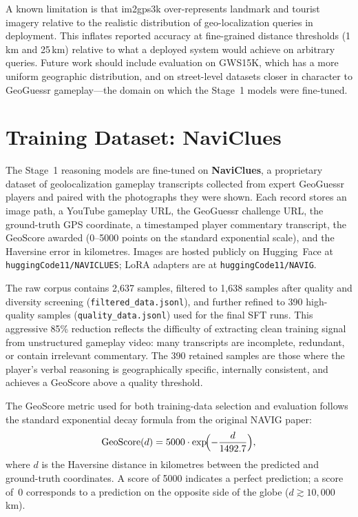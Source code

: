 \documentclass[11pt]{article}
\begin{document}
A known limitation is that im2gps3k over-represents landmark and tourist imagery
relative to the realistic distribution of geo-localization queries in deployment.
This inflates reported accuracy at fine-grained distance thresholds (1\,km and
25\,km) relative to what a deployed system would achieve on arbitrary queries.
Future work should include evaluation on GWS15K, which has a more uniform
geographic distribution, and on street-level datasets closer in character to
GeoGuessr gameplay---the domain on which the Stage~1 models were fine-tuned.

\section{Training Dataset: NaviClues}
\label{sec:navclues}

The Stage~1 reasoning models are fine-tuned on \textbf{NaviClues}, a proprietary
dataset of geolocalization gameplay transcripts collected from expert GeoGuessr
players and paired with the photographs they were shown. Each record stores an image
path, a YouTube gameplay URL, the GeoGuessr challenge URL, the ground-truth GPS
coordinate, a timestamped player commentary transcript, the GeoScore awarded
(0--5000 points on the standard exponential scale), and the Haversine error in
kilometres. Images are hosted publicly on Hugging~Face at
\texttt{huggingCode11/NAVICLUES}; LoRA adapters are at \texttt{huggingCode11/NAVIG}.

The raw corpus contains 2{,}637 samples, filtered to 1{,}638 samples after quality
and diversity screening (\texttt{filtered\_data.jsonl}), and further refined to
390 high-quality samples (\texttt{quality\_data.jsonl}) used for the final SFT runs.
This aggressive 85\% reduction reflects the difficulty of extracting clean
training signal from unstructured gameplay video: many transcripts are incomplete,
redundant, or contain irrelevant commentary. The 390 retained samples are those
where the player's verbal reasoning is geographically specific, internally
consistent, and achieves a GeoScore above a quality threshold.

The GeoScore metric used for both training-data selection and evaluation follows the
standard exponential decay formula from the original NAVIG paper:
\begin{equation}
  \label{eq:geoscore}
  \mathrm{GeoScore}(d) = 5000 \cdot \exp\!\Bigl(-\frac{d}{1492.7}\Bigr),
\end{equation}
where $d$ is the Haversine distance in kilometres between the predicted and
ground-truth coordinates. A score of 5000 indicates a perfect prediction;
a score of~0 corresponds to a prediction on the opposite side of the globe
($d \gtrsim 10{,}000$\,km).
\end{document}
